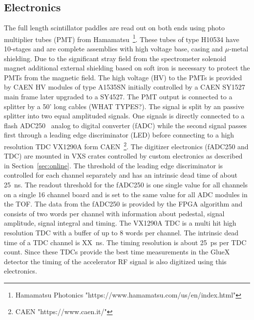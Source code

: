 \subsection{Electronics \label{sec:scelectronics}}
The full length scintillator paddles are read out on both ends using photo multiplier tubes (PMT) from Hamamatsu~\footnote{Hamamatsu Photonics "https://www.hamamatsu.com/us/en/index.html"}. These tubes of type H10534 have 10-stages and are complete assemblies with high voltage base, casing and $\mu$-metal shielding. Due to the significant stray field from the spectrometer solenoid magnet additional external
shielding based on soft iron is necessary to protect the PMTs from the magnetic field.
The high voltage (HV) to the PMTs is provided by CAEN HV modules of type A1535SN initially controlled by a CAEN SY1527 main frame
later upgraded to a SY4527.
The PMT output is connected to a splitter by a 50' long cables (WHAT TYPES?). The signal is split by
an passive splitter into two equal amplituded signals. One signals is directly connected to a flash ADC250~\cite{Dong:2007}
analog to digital converter (fADC) while the second signal passes first through a leading edge discriminator (LED) before connecting to 
a high resolution TDC VX1290A form CAEN~\footnote{CAEN "https://www.caen.it/"}. The digitizer electronics (fADC250 and TDC) are mounted
in VXS crates controlled by custom electronics as described in Section~\ref{sec:online}.
The threshold of the leading edge discriminator is controlled for each channel separately and has an intrinsic
dead time of about 25~ns.
The readout threshold for
the fADC250 is one single value for all channels on a single 16 channel board and is set to the same value for
all ADC modules in the TOF. The data from the fADC250 is provided by the FPGA algorithm and consists
of two words per channel with information about pedestal, signal amplitude, signal integral and timing.
The VX1290A TDC is a multi hit high resolution TDC with a buffer of 
up to 8 words per channel. The intrinsic dead time of a TDC channel is XX~ns. The timing resolution is about 25~ps per TDC count.
Since these TDCs provide the best time measurements in the GlueX detector the timing of the accelerator RF signal is also
digitized using this electronics.

